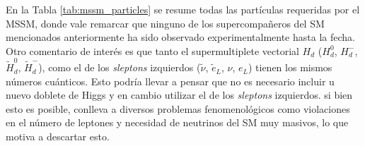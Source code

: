 En la Tabla \ref{tab:mssm_particles} se resume todas las partículas requeridas por el MSSM, donde vale remarcar que ninguno de los supercompañeros del SM mencionados anteriormente ha sido observado experimentalmente hasta la fecha. Otro comentario de interés es que tanto el supermultiplete vectorial $H_d$ ($H_d^0$, $H_d^-$, $\widetilde{H}_d^0$, $\widetilde{H}_d^-$), como el de los \textit{sleptons} izquierdos ($\tilde{\nu}$, $\tilde{e}_L$, $\nu$, $e_L$) tienen los mismos números cuánticos. Esto podría llevar a pensar que no es necesario incluir u nuevo doblete de Higgs y en cambio utilizar el de los \textit{sleptons} izquierdos. si bien esto es posible, conlleva a diversos problemas fenomenológicos como violaciones en el número de leptones y necesidad de neutrinos del SM muy masivos, lo que motiva a descartar esto.


